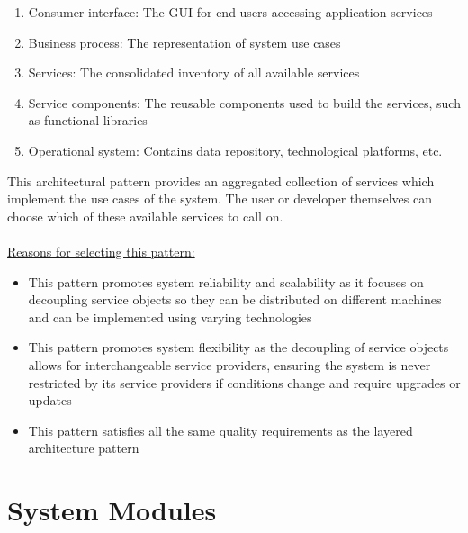 \documentclass[a4paper,10pt]{article}
\begin{document}
\begin{itemize}
	\begin{enumerate}
		\item Consumer interface: The GUI for end users accessing application services 
		\item Business process: The representation of system use cases 
		\item Services: The consolidated inventory of all available services
		\item Service components: The reusable components used to build the services, such as functional libraries
		\item Operational system: Contains data repository, technological platforms, etc. \\
	\end{enumerate}
	This architectural pattern provides an aggregated collection of services which implement the use cases of the system. The user or developer themselves can choose which of these available services to call on.\\\\
	\underline{Reasons for selecting this pattern:}
	\begin{itemize}
		\item This pattern promotes system reliability and scalability as it focuses on decoupling service objects so they can be distributed on different machines and can be implemented using varying technologies
		\item This pattern promotes system flexibility as the decoupling of service objects allows for interchangeable service providers, ensuring the system is never restricted by its service providers if conditions change and require upgrades or updates
		\item This pattern satisfies all the same quality requirements as the layered architecture pattern
	\end{itemize}
\end{itemize}

\section{System Modules}
\end{document}
